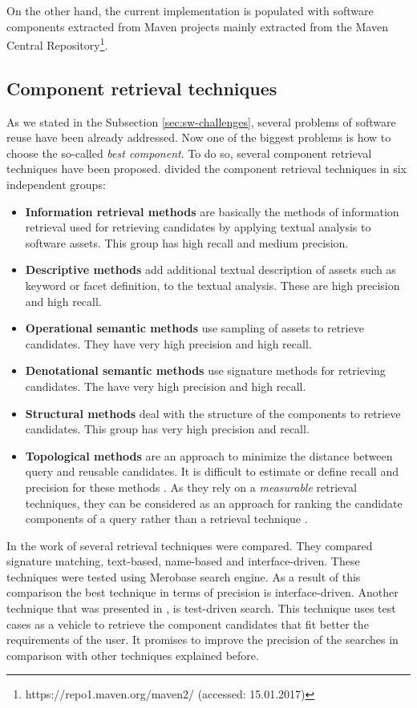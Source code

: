On the other hand, the current implementation is populated with software components extracted from Maven projects mainly extracted from the Maven Central Repository\footnote{https://repo1.maven.org/maven2/ (accessed: 15.01.2017)}. 

\subsection{Component retrieval techniques}
As we stated in the Subsection \ref{sec:sw-challenges}, several problems of software reuse have been already addressed. Now one of the biggest problems is how to choose the so-called \emph{best component}. To do so, several component retrieval techniques have been proposed. \citet{Mili1998} divided the component retrieval techniques in six independent groups:

\begin{itemize}
\item \textbf{Information retrieval methods} are basically the methods of information retrieval used for retrieving candidates by applying textual analysis to software assets. This group has high recall and medium precision.
\item \textbf{Descriptive methods} add additional textual description of assets such as keyword or facet definition, to the textual analysis. These are high precision and high recall.
\item \textbf{Operational semantic methods} use sampling of assets to retrieve candidates. They have very high precision and high recall.
\item \textbf{Denotational semantic methods} use signature methods for retrieving candidates. The have very high precision and high recall.
\item \textbf{Structural methods} deal with the structure of the components to retrieve candidates. This group has very high precision and recall.
\item \textbf{Topological methods} are an approach to minimize the distance between query and reusable candidates. It is difficult to estimate or define recall and precision for these methods \cite{Mili1998}. As they rely on a \textit{measurable} retrieval techniques, they can be considered as an approach for ranking the candidate components of a query rather than a retrieval technique \cite{Hummel2007}.
\end{itemize}

In the work of \citet{Hummel2007} several retrieval techniques were compared. They compared signature matching, text-based, name-based and interface-driven. These techniques were tested using Merobase search engine. As a result of this comparison the best technique in terms of precision is interface-driven. Another technique that was presented in \cite{Hummel2004}, is test-driven search. This technique uses test cases as a vehicle to retrieve the component candidates that fit better the requirements of the user. It promises to improve the precision of the searches in comparison with other techniques explained before.

